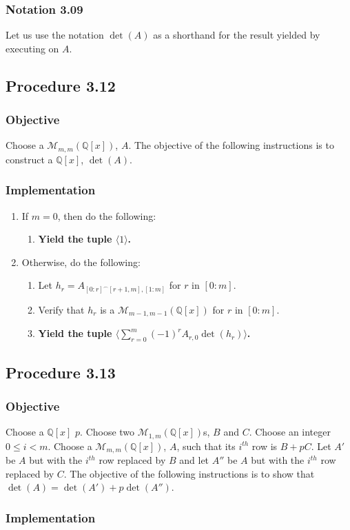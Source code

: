 \documentclass[twocolumn]{article}
\newcommand{\notation}[1]{\subsubsection*{Notation #1}}
\newcommand{\procedure}[2][]{\subsection*{Procedure #2 \ifthenelse{\equal{#1}{}}{}{(#1)}}\label{sec:procedure #2}}
\newcommand{\objective}{\subsubsection*{Objective}}
\newcommand{\implementation}{\subsubsection*{Implementation}}
\newcommand{\procedurehr}[2][]{\hyperref[sec:procedure #2]{\ifthenelse{\equal{#1}{}}{procedure #2}{#1}}}
\begin{document}
		\notation{3.09}
			Let us use the notation $\det(A)$ as a shorthand for the result yielded by executing \procedurehr{3.12} on $A$.
		\procedure{3.12}
			\objective
				Choose a $\mathcal{M}_{m,m}(\mathbb{Q}[x])$, $A$. The objective of the following instructions is to construct a $\mathbb{Q}[x]$, $\det(A)$.
			\implementation
				\begin{enumerate}
					\item If $m=0$, then do the following:
					\begin{enumerate}
						\item \textbf{Yield the tuple $\langle 1\rangle$.}
					\end{enumerate}
					\item Otherwise, do the following:
					\begin{enumerate}
						\item Let $h_r=A_{[0:r]^\frown[r+1,m],[1:m]}$ for $r$ in $[0:m]$.
						\item Verify that $h_r$ is a $\mathcal{M}_{m-1,m-1}(\mathbb{Q}[x])$ for $r$ in $[0:m]$.
						\item \textbf{Yield the tuple $\langle\sum_{r=0}^m (-1)^{r}A_{r,0}\det(h_r)\rangle$.}
					\end{enumerate}
				\end{enumerate}
		\procedure{3.13}
			\objective
				Choose a $\mathbb{Q}[x]$ $p$. Choose two $\mathcal{M}_{1,m}(\mathbb{Q}[x])$s, $B$ and $C$. Choose an integer $0\le i<m$. Choose a $\mathcal{M}_{m,m}(\mathbb{Q}[x])$, $A$, such that its $i^{th}$ row is $B+pC$. Let $A'$ be $A$ but with the $i^{th}$ row replaced by $B$ and let $A''$ be $A$ but with the $i^{th}$ row replaced by $C$. The objective of the following instructions is to show that $\det(A)=\det(A')+p\det(A'')$.
			\implementation
\end{document}
